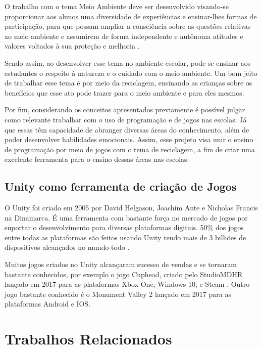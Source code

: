 \begin{citacao}

O trabalho com o tema Meio Ambiente deve ser desenvolvido visando-se proporcionar aos alunos uma diversidade de experiências e ensinar-lhes formas de participação, para que possam ampliar a consciência sobre as questões relativas ao meio ambiente e assumirem de forma independente e autônoma atitudes e valores voltados à sua proteção e melhoria \cite[p. 46]{pcns_2001}.

\end{citacao}


Sendo assim, ao desenvolver esse tema no ambiente escolar, pode-se ensinar aos estudantes o respeito à natureza e o cuidado com o meio ambiente. Um bom jeito de trabalhar esse tema é por meio da reciclagem, ensinando as crianças sobre os benefícios que esse ato pode trazer para o meio ambiente e para eles mesmos.

Por fim, considerando os conceitos apresentados previamente é possível julgar como relevante trabalhar com o uso de programação e de jogos nas escolas. Já que essas têm capacidade de abranger diversas áreas do conhecimento, além de poder desenvolver habilidades emocionais. Assim, esse projeto visa unir o ensino de programação por meio de jogos com o tema de reciclagem, a fim de criar uma excelente ferramenta para o ensino dessas áreas nas escolas.

\subsection{Unity como ferramenta de criação de Jogos}

O Unity foi criado em 2005 por David Helgason, Joachim Ante e Nicholas
Francis na Dinamarca. É uma ferramenta com bastante força no mercado de jogos por suportar o desenvolvimento para diversas plataformas digitais. 50\% dos jogos entre todas as plataformas são feitos usando Unity tendo mais de 3 bilhões de dispositivos alcançados no mundo todo \cite{dados_unity}.

Muitos jogos criados no Unity alcançaram sucesso de vendas e se tornaram bastante conhecidos, por exemplo o jogo Cuphead, criado pelo StudioMDHR lançado em 2017 para as plataformas Xbox One, Windows 10, e Steam \cite{cuphead}. Outro jogo bastante conhecido é o Monument Valley 2 lançado em 2017 para as plataformas Android e IOS\cite{monument_valley_2}.




\section{Trabalhos Relacionados}

